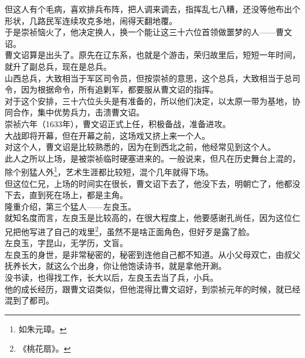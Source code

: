 \begin{multicols}{\theparacolNo}
但这人有个毛病，喜欢排兵布阵，把人调来调去，指挥乱七八糟，还没等他布出个形状，几路民军连续攻克多地，闹得天翻地覆。\\

于是崇祯恼火了，他决定换人，换一个能让这三十六位首领做噩梦的人——曹文诏。\\

曹文诏算是出头了。原先在辽东系，也就是个游击，荣归故里后，短短一年时间，就升了副总兵，现在是总兵。\\

山西总兵，大致相当于军区司令员，但按崇祯的意思，这个总兵，大致相当于总司令，因为根据命令，所有追剿军，都要服从曹文诏的指挥。\\

对于这个安排，三十六位头头是有准备的，所以他们决定，以太原一带为基地，协同合作，集中优势兵力，击溃曹文诏。\\

崇祯六年（1633年），曹文诏正式上任，积极备战，准备进攻。\\

大战即将开幕，但在开幕之前，这场戏又挤上来一个人。\\

对这个人，曹文诏是比较熟悉的，因为在到西北之前，他经常见到这个人。\\

此人之所以上场，是被崇祯临时硬塞进来的。一般说来，但凡在历史舞台上混的，除个别猛人外\footnote{如朱元璋。}，艺术生涯都比较短，混个几年就得下场。\\

但这位仁兄，上场的时间实在很长，曹文诏下去了，他没下去，明朝亡了，他都没下去，直到死在场上，都是主角。\\

隆重介绍，第三个猛人——左良玉。\\

就知名度而言，左良玉是比较高的，在很大程度上，他要感谢孔尚任，因为这位仁兄把他写进了自己的戏里\footnote{《桃花扇》。}，虽然不是啥正面角色，但好歹是露了脸。\\

左良玉，字昆山，无学历，文盲。\\

左良玉的身世，是非常秘密的，秘密到连他自己都不知道。从小父母双亡，由叔父抚养长大，就这么个出身，你让他饱读诗书，就是拿他开涮。\\

没书读，也得找工作，长大以后，左良玉去当了兵，小兵。\\

他的成长经历，跟曹文诏类似，但他混得比曹文诏好，到崇祯元年的时候，就已经混到了都司。\\


\end{multicols}
